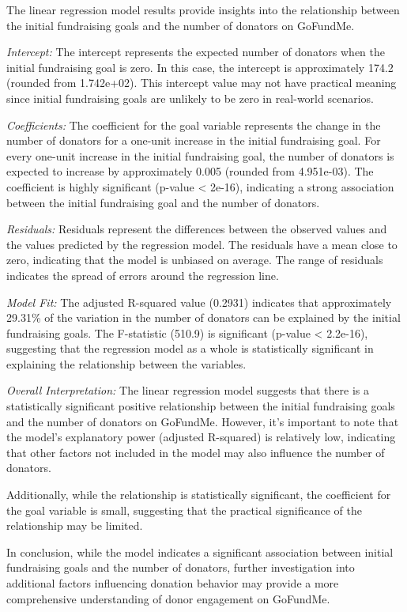 \documentclass[
  letterpaper,
  DIV=11,
  numbers=noendperiod]{scrartcl}
\begin{document}
The linear regression model results provide insights into the
relationship between the initial fundraising goals and the number of
donators on GoFundMe.

\emph{Intercept:} The intercept represents the expected number of
donators when the initial fundraising goal is zero. In this case, the
intercept is approximately 174.2 (rounded from 1.742e+02). This
intercept value may not have practical meaning since initial fundraising
goals are unlikely to be zero in real-world scenarios.

\emph{Coefficients:} The coefficient for the goal variable represents
the change in the number of donators for a one-unit increase in the
initial fundraising goal. For every one-unit increase in the initial
fundraising goal, the number of donators is expected to increase by
approximately 0.005 (rounded from 4.951e-03). The coefficient is highly
significant (p-value \textless{} 2e-16), indicating a strong association
between the initial fundraising goal and the number of donators.

\emph{Residuals:} Residuals represent the differences between the
observed values and the values predicted by the regression model. The
residuals have a mean close to zero, indicating that the model is
unbiased on average. The range of residuals indicates the spread of
errors around the regression line.

\emph{Model Fit:} The adjusted R-squared value (0.2931) indicates that
approximately 29.31\% of the variation in the number of donators can be
explained by the initial fundraising goals. The F-statistic (510.9) is
significant (p-value \textless{} 2.2e-16), suggesting that the
regression model as a whole is statistically significant in explaining
the relationship between the variables.

\emph{Overall Interpretation:} The linear regression model suggests that
there is a statistically significant positive relationship between the
initial fundraising goals and the number of donators on GoFundMe.
However, it's important to note that the model's explanatory power
(adjusted R-squared) is relatively low, indicating that other factors
not included in the model may also influence the number of donators.

Additionally, while the relationship is statistically significant, the
coefficient for the goal variable is small, suggesting that the
practical significance of the relationship may be limited.

In conclusion, while the model indicates a significant association
between initial fundraising goals and the number of donators, further
investigation into additional factors influencing donation behavior may
provide a more comprehensive understanding of donor engagement on
GoFundMe.
\end{document}
